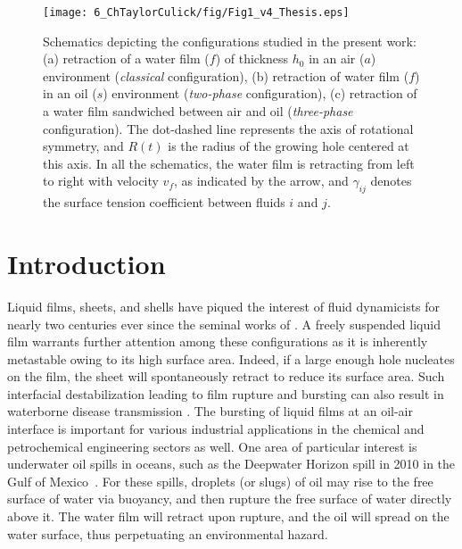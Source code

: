 \begin{sidewaysfigure}
	\centering
	\texttt{[image: 6\_ChTaylorCulick/fig/Fig1\_v4\_Thesis.eps]}
	\caption{Schematics depicting the configurations studied in the present work: (a) retraction of a water film ($f$) of thickness $h_0$ in an air ($a$) environment (\emph{classical} configuration),  (b) retraction of water film ($f$) in an oil ($s$) environment (\emph{two-phase} configuration), (c) retraction of a water film sandwiched between air and oil (\emph{three-phase} configuration). The dot-dashed line represents the axis of rotational symmetry, and $R(t)$ is the radius of the growing hole centered at this axis. In all the schematics, the water film is retracting from left to right with velocity $v_f$, as indicated by the arrow, and $\gamma_{ij}$ denotes the surface tension coefficient between fluids $i$ and $j$.}
	\label{Ch6:fig:configs}
\end{sidewaysfigure}

\section{Introduction}\label{Ch6:Intro}

Liquid films, sheets, and shells have piqued the interest of fluid dynamicists \citep{clanet2007waterbells, villermaux2020fragmentation} for nearly two centuries ever since the seminal works of \citet{savart1833oppositejets, savart1833waterbells, savart1833hydraulicjump, taylor1959dynamics, taylor-1959-procrsoclonda}. A freely suspended liquid film warrants further attention among these configurations as it is inherently metastable owing to its high surface area. Indeed, if a large enough \citep{taylor1973making, villermaux2020fragmentation} hole nucleates on the film, the sheet will spontaneously retract to reduce its surface area. Such interfacial destabilization leading to film rupture and bursting can also result in waterborne disease transmission \citep{bourouiba2021fluid}. The bursting of liquid films at an oil-air interface is important for various industrial applications in the chemical and petrochemical engineering sectors as well. One area of particular interest is underwater oil spills in oceans, such as the Deepwater Horizon spill in 2010 in the Gulf of Mexico~\citep{summerhayes2011deep}. For these spills, droplets (or slugs) of oil may rise to the free surface of water via buoyancy, and then rupture the free surface of water directly above it. The water film will retract upon rupture, and the oil will spread on the water surface, thus perpetuating an environmental hazard. 

